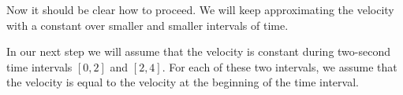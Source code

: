 \documentclass{ximera}
\begin{document}
\begin{example}
\begin{explanation}
%      
%
%
%
%      
Now it should be clear how to proceed. We will keep approximating the velocity with a constant over smaller and smaller intervals of time.


In our next step we will assume that the velocity is constant during two-second time intervals $[0,2]$ and $[2,4]$. For each of these two intervals, we assume that the velocity is equal to the velocity at the beginning of the time interval.


\end{explanation}
\end{example}
\end{document}
